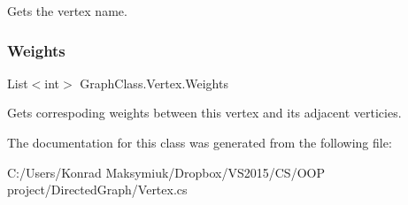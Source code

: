 Gets the vertex name. 

\mbox{\label{class_graph_class_1_1_vertex_ad0c0d9ff9480f322a49d87257a269257}} 
\subsubsection{\texorpdfstring{Weights}{Weights}}
{\footnotesize\ttfamily List$<$int$>$ Graph\+Class.\+Vertex.\+Weights\hspace{0.3cm}{\ttfamily [get]}}



Gets correspoding weights between this vertex and its adjacent verticies. 



The documentation for this class was generated from the following file\+:\begin{DoxyCompactItemize}
\item 
C\+:/\+Users/\+Konrad Maksymiuk/\+Dropbox/\+V\+S2015/\+C\+S/\+O\+O\+P project/\+Directed\+Graph/Vertex.\+cs\end{DoxyCompactItemize}

